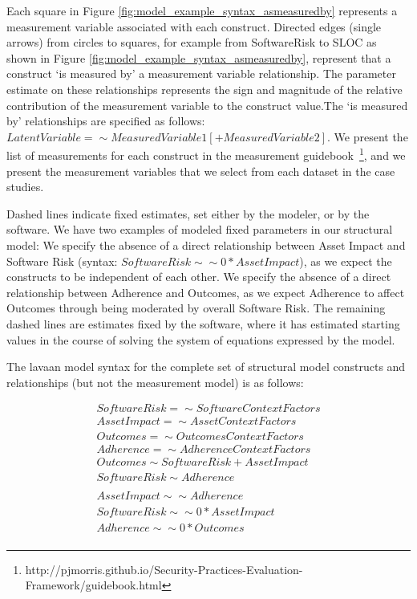 Each square in Figure \ref{fig:model_example_syntax_asmeasuredby} represents a measurement variable associated with each construct. Directed edges (single arrows) from circles to squares, for example from SoftwareRisk to SLOC as shown in Figure \ref{fig:model_example_syntax_asmeasuredby}, represent that a construct `is measured by' a measurement variable relationship. The parameter estimate on these relationships represents the sign and magnitude of the relative contribution of the measurement variable to the construct value.The `is measured by' relationships are specified as follows: $LatentVariable =\sim MeasuredVariable1 [+ MeasuredVariable2]$. We present the list of measurements for each construct in the measurement guidebook~\footnote{http://pjmorris.github.io/Security-Practices-Evaluation-Framework/guidebook.html}, and we present the measurement variables that we select from each dataset in the case studies.  

Dashed lines indicate fixed estimates, set either by the modeler, or by the software. We have two examples of modeled fixed parameters in our structural model: We specify the absence of a direct relationship between Asset Impact and Software Risk (syntax: $SoftwareRisk \sim\sim 0*AssetImpact$), as we expect the constructs to be independent of each other. We specify the absence of a direct relationship between Adherence and Outcomes, as we expect Adherence to affect Outcomes through being moderated by overall Software Risk. The remaining dashed lines are estimates fixed by the software, where it has estimated starting values in the course of solving the system of equations expressed by the model. 

The lavaan model syntax for the complete set of structural model constructs and relationships (but not the measurement model) is as follows:
 
 \begin{align*}
 SoftwareRisk =\sim SoftwareContextFactors\\
 AssetImpact =\sim AssetContextFactors\\
 Outcomes =\sim OutcomesContextFactors\\ 
 Adherence =\sim AdherenceContextFactors\\
 Outcomes \sim SoftwareRisk + AssetImpact\\
 SoftwareRisk \sim Adherence\\
 \\
 AssetImpact \sim\sim  Adherence\\
 SoftwareRisk \sim\sim 0*AssetImpact\\
 Adherence \sim\sim 0*Outcomes\\
 \end{align*}
 
